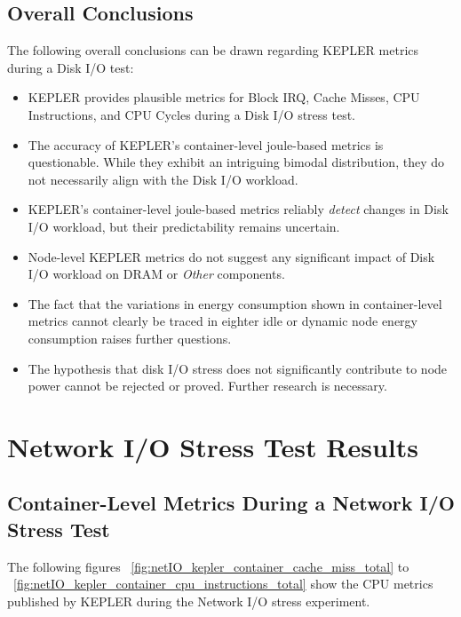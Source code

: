 \subsection{Overall Conclusions}

The following overall conclusions can be drawn regarding KEPLER metrics during a Disk I/O test:

\begin{itemize}
    \item KEPLER provides plausible metrics for Block IRQ, Cache Misses, CPU Instructions, and CPU Cycles during a Disk I/O stress test.
    \item The accuracy of KEPLER’s container-level joule-based metrics is questionable. While they exhibit an intriguing bimodal distribution, they do not necessarily align with the Disk I/O workload.
    \item KEPLER’s container-level joule-based metrics reliably \textit{detect} changes in Disk I/O workload, but their predictability remains uncertain.
    \item Node-level KEPLER metrics do not suggest any significant impact of Disk I/O workload on DRAM or \textit{Other} components.
    \item The fact that the variations in energy consumption shown in container-level metrics cannot clearly be traced in eighter idle or dynamic node energy consumption raises further questions.
    \item The hypothesis that disk I/O stress does not significantly contribute to node power cannot be rejected or proved. Further research is necessary.
\end{itemize}

\section{Network I/O Stress Test Results}

\subsection{Container-Level Metrics During a Network I/O Stress Test}

The following figures ~\ref{fig:netIO_kepler_container_cache_miss_total} to ~\ref{fig:netIO_kepler_container_cpu_instructions_total} show the CPU metrics published by KEPLER during the Network I/O stress experiment.


